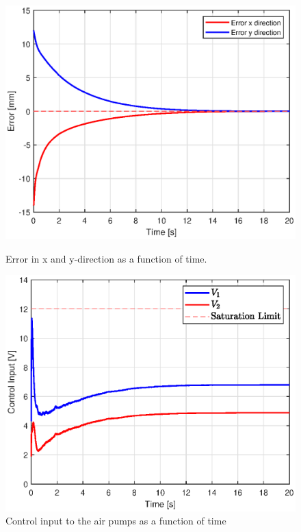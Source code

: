 \begin{figure}[H]
    \centering
\begin{minipage}{0.5\textwidth}
        \centering
        \includegraphics[width=\textwidth]{Figures/Chapter5/errorxysim.eps} 
        \caption{Error in x and y-direction as a function of time.}
        \label{fig5:errorsim}
    \end{minipage}\hfill
    \begin{minipage}{0.5\textwidth}
        \centering
        \includegraphics[width=\textwidth]{Figures/Chapter5/controlinputsim.eps} 
        \caption{Control input to the air pumps as a function of time}
        \label{fig5:controlinputsim}
    \end{minipage}
\end{figure}


